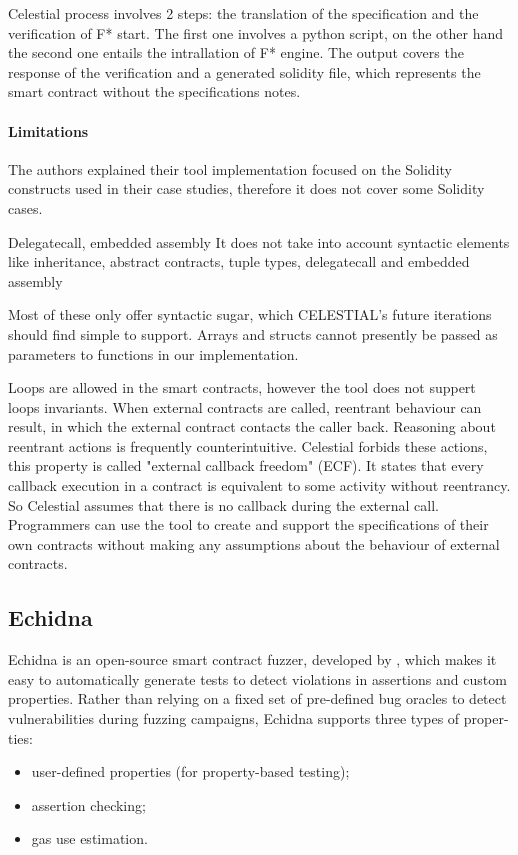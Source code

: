 Celestial process involves 2 steps: the translation of the specification and the verification of F* start. 
The first one involves a python script, on the other hand the second one entails the intrallation of F* engine. 
The output covers the response of the verification and a generated solidity file, which represents the smart contract without the specifications notes. 

\paragraph{Limitations} 
The authors explained their tool implementation focused on the Solidity constructs used in their case studies, therefore it does not cover some Solidity cases. 

Delegatecall, embedded assembly
It does not take into account syntactic elements like inheritance, abstract contracts, tuple types, delegatecall and  embedded assembly

Most of these only offer syntactic sugar, which CELESTIAL's future iterations should find simple to support.
Arrays and structs cannot presently be passed as parameters to functions in our implementation. 

Loops are allowed in the smart contracts, however the tool does not suppert loops invariants.
When external contracts are called, reentrant behaviour can result, in which the external contract contacts the caller back.
Reasoning about reentrant actions is frequently counterintuitive.
Celestial forbids these actions, this property is called "external callback freedom" (ECF). It states that every callback execution 
in a contract is equivalent to some activity without reentrancy.
So Celestial assumes that there is no callback during the external call.
Programmers can use the tool to create and support the specifications of their own contracts without making any assumptions about the behaviour of external contracts. 

\subsection{Echidna}
\label{sec:Specification:Echidna}
Echidna is an open-source smart contract fuzzer, developed by \citet{Echidna}, which makes it easy to automatically generate tests to detect violations in
assertions and custom properties.
Rather than relying on a fixed set of pre-defined bug oracles to detect vulnerabilities
during fuzzing campaigns, Echidna supports three types of proper-
ties: 
\begin{itemize}
    \item user-defined properties (for property-based testing);
    \item assertion checking;
    \item gas use estimation.
\end{itemize}


